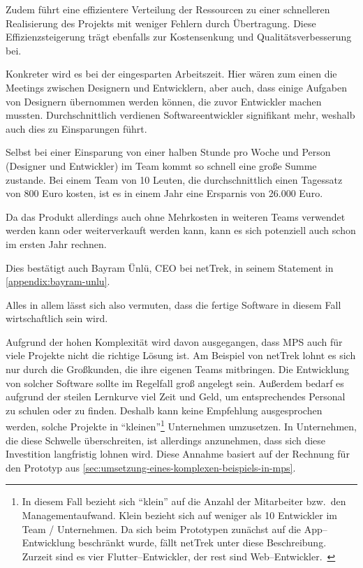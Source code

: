 Zudem führt eine effizientere Verteilung der Ressourcen zu einer schnelleren Realisierung des Projekts mit weniger Fehlern durch Übertragung.
Diese Effizienzsteigerung trägt ebenfalls zur Kostensenkung und Qualitätsverbesserung bei.

Konkreter wird es bei der eingesparten Arbeitszeit.
Hier wären zum einen die Meetings zwischen Designern und Entwicklern, aber auch, dass einige Aufgaben von Designern übernommen werden können, die zuvor Entwickler machen mussten.
Durchschnittlich verdienen Softwareentwickler signifikant mehr, weshalb auch dies zu Einsparungen führt.~\autocite{gehaltde-2024B,gehaltde-2024A}

Selbst bei einer Einsparung von einer halben Stunde pro Woche und Person (Designer und Entwickler) im Team kommt so schnell eine große Summe zustande.
Bei einem Team von 10 Leuten, die durchschnittlich einen Tagessatz von 800 Euro kosten, ist es in einem Jahr eine Ersparnis von 26.000 Euro.

Da das Produkt allerdings auch ohne Mehrkosten in weiteren Teams verwendet werden kann oder weiterverkauft werden kann, kann es sich potenziell auch schon im ersten Jahr rechnen.

Dies bestätigt auch Bayram Ünlü, \ac{CEO} bei \ac{netTrek}, in seinem Statement in \autoref{appendix:bayram-unlu}.

Alles in allem lässt sich also vermuten, dass die fertige Software in diesem Fall wirtschaftlich sein wird.

Aufgrund der hohen Komplexität wird davon ausgegangen, dass \ac{MPS} auch für viele Projekte nicht die richtige Lösung ist.
Am Beispiel von \ac{netTrek} lohnt es sich nur durch die Großkunden, die ihre eigenen Teams mitbringen.
Die Entwicklung von solcher Software sollte im Regelfall groß angelegt sein.
Außerdem bedarf es aufgrund der steilen Lernkurve viel Zeit und Geld, um entsprechendes Personal zu schulen oder zu finden.
Deshalb kann keine Empfehlung ausgesprochen werden, solche Projekte in \enquote{kleinen}\footnote{In diesem Fall bezieht sich \enquote{klein} auf die Anzahl der Mitarbeiter bzw.\ den Managementaufwand. Klein bezieht sich auf weniger als 10 Entwickler im Team / Unternehmen. Da sich beim Prototypen zunächst auf die App--Entwicklung beschränkt wurde, fällt \ac{netTrek} unter diese Beschreibung. Zurzeit sind es vier Flutter--Entwickler, der rest sind Web--Entwickler.~\autocite{nettrek-gmbh-co-kg-no-date}} Unternehmen umzusetzen.
In Unternehmen, die diese Schwelle überschreiten, ist allerdings anzunehmen, dass sich diese Investition langfristig lohnen wird.
Diese Annahme basiert auf der Rechnung für den Prototyp aus \autoref{sec:umsetzung-eines-komplexen-beispiels-in-mps}.
